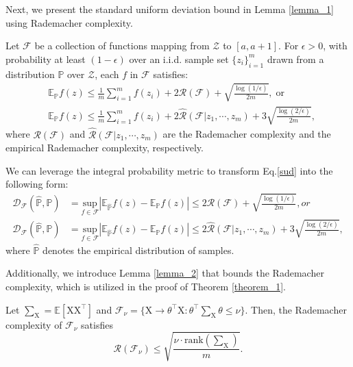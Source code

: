 Next, we present the standard uniform deviation bound in Lemma \ref{lemma_1} \cite{mohri2018foundations} using Rademacher complexity.
\begin{lemma}
\label{lemma_1}
    Let $\mathcal{F}$ be a collection of functions mapping from $\mathcal{Z}$ to $[a,a+1]$. For $\epsilon > 0$, with probability at least $(1-\epsilon)$ over an i.i.d. sample set $\{z_i\}_{i=1}^m$ drawn from a distribution $\mathbb{P}$ over $\mathcal{Z}$, each $f$ in $\mathcal{F}$ satisfies:
    \begin{equation}
    \label{sud}
    \begin{aligned}
        &\mathbb{E}_{\mathbb{P}}f(z)\leq\frac{1}{m}\sum_{i=1}^mf(z_i)+2\mathcal{R}(\mathcal{F})+\sqrt{\frac{\log(1/\epsilon)}{2m}},\;\text{or} \\
        &\mathbb{E}_{\mathbb{P}}f(z)\leq\frac{1}{m}\sum_{i=1}^mf(z_i)+2\hat{\mathcal{R}}(\mathcal{F}|z_1,\cdots,z_m)+3\sqrt{\frac{\log(2/\epsilon)}{2m}},
    \end{aligned} 
    \end{equation}
    where $\mathcal{R}(\mathcal{F})$ and $\hat{\mathcal{R}}(\mathcal{F}|z_1,\cdots,z_m)$ are the Rademacher complexity and the empirical Rademacher complexity, respectively.
\end{lemma}
We can leverage the integral probability metric to transform Eq.\ref{sud} into the following form:
\begin{equation}
\begin{aligned}
    \mathcal{D}_\mathcal{F}(\hat{\mathbb{P}},\mathbb{P}) &= \underset{f\in\mathcal{F}}{\text{sup}}\left|\mathbb{E}_{\hat{\mathbb{P}}}f(z)-\mathbb{E}_{\mathbb{P}}f(z)\right|\leq2\mathcal{R}(\mathcal{F})+\sqrt{\frac{\log(1/\epsilon)}{2m}}, or\\
    \mathcal{D}_\mathcal{F}(\hat{\mathbb{P}},\mathbb{P}) &= \underset{f\in\mathcal{F}}{\text{sup}}\left|\mathbb{E}_{\hat{\mathbb{P}}}f(z)-\mathbb{E}_{\mathbb{P}}f(z)\right|\leq2\hat{\mathcal{R}}(\mathcal{F}|z_1,\cdots,z_m)+3\sqrt{\frac{\log(2/\epsilon)}{2m}},
\end{aligned}
\end{equation}
where $\hat{\mathbb{P}}$ denotes the empirical distribution of samples.

Additionally, we introduce Lemma \ref{lemma_2} that bounds the Rademacher complexity, which is utilized in the proof of Theorem \ref{theorem_1}.
\begin{lemma}
\label{lemma_2}
    Let $\sum_\mathrm{X}=\mathbb{E}[\mathrm{X}\mathrm{X}^\top]$ %
    and $\mathcal{F}_\nu=\{\mathrm{X}\rightarrow\theta^\top \mathrm{X}:%
    \theta^\top\sum_\mathrm{X}\theta\leq\nu\}$. Then, the Rademacher complexity of $\mathcal{F}_\nu$ satisfies
    \begin{equation}
        \mathcal{R}(\mathcal{F}_\nu)\leq \sqrt{\frac{\nu\cdot\textrm{rank}(\sum_\mathrm{X})}{m}}.
    \end{equation}
\end{lemma}

